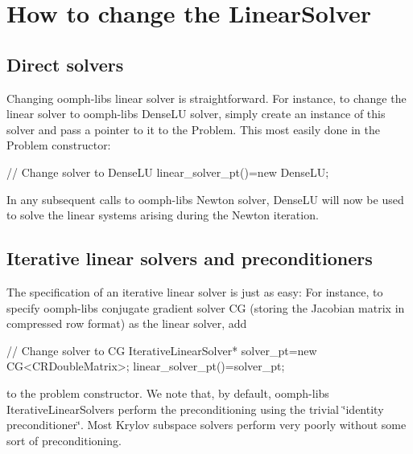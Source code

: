  

\hypertarget{index_how_to_change_linear_solver}{}\section{How to change the Linear\+Solver}\label{index_how_to_change_linear_solver}
\hypertarget{index_direct}{}\subsection{Direct solvers}\label{index_direct}
Changing {\ttfamily oomph-\/lib\textquotesingle{}s} linear solver is straightforward. For instance, to change the linear solver to {\ttfamily oomph-\/lib\textquotesingle{}s} {\ttfamily Dense\+LU} solver, simply create an instance of this solver and pass a pointer to it to the {\ttfamily Problem}. This most easily done in the {\ttfamily Problem} constructor\+:

 
\begin{DoxyCodeInclude}
 \textcolor{comment}{// Change solver to DenseLU}
 linear\_solver\_pt()=\textcolor{keyword}{new} DenseLU;

\end{DoxyCodeInclude}


In any subsequent calls to {\ttfamily oomph-\/lib\textquotesingle{}s} Newton solver, {\ttfamily Dense\+LU} will now be used to solve the linear systems arising during the Newton iteration.



 

\hypertarget{index_iterative_linear_solvers}{}\subsection{Iterative linear solvers and preconditioners}\label{index_iterative_linear_solvers}
The specification of an iterative linear solver is just as easy\+: For instance, to specify {\ttfamily oomph-\/lib\textquotesingle{}s} conjugate gradient solver {\ttfamily CG} (storing the Jacobian matrix in compressed row format) as the linear solver, add

 
\begin{DoxyCodeInclude}
 \textcolor{comment}{// Change solver to CG}
 IterativeLinearSolver* solver\_pt=\textcolor{keyword}{new} CG<CRDoubleMatrix>;
 linear\_solver\_pt()=solver\_pt;

\end{DoxyCodeInclude}


to the problem constructor. We note that, by default, {\ttfamily oomph-\/lib\textquotesingle{}s} {\ttfamily Iterative\+Linear\+Solvers} perform the preconditioning using the trivial \char`\"{}identity preconditioner\char`\"{}. Most Krylov subspace solvers perform very poorly without some sort of preconditioning.


